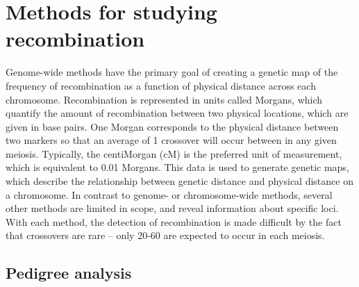 \section{Methods for studying recombination}

Genome-wide methods have the primary goal of creating a genetic map of the frequency of recombination as a function of physical distance across each chromosome.
Recombination is represented in units called Morgans, which quantify the amount of recombination between two physical locations, which are given in base pairs.
One Morgan corresponds to the physical distance between two markers so that an average of 1 crossover will occur between in any given meiosis.
Typically, the centiMorgan (cM) is the preferred unit of measurement, which is equivalent to 0.01 Morgans.
This data is used to generate genetic maps, which describe the relationship between genetic distance and physical distance on a chromosome.
In contrast to genome- or chromosome-wide methods, several other methods are limited in scope, and reveal information about specific loci.
With each method, the detection of recombination is made difficult by the fact that crossovers are rare -- only 20-60 are expected to occur in each meiosis.


\subsection{Pedigree analysis}

